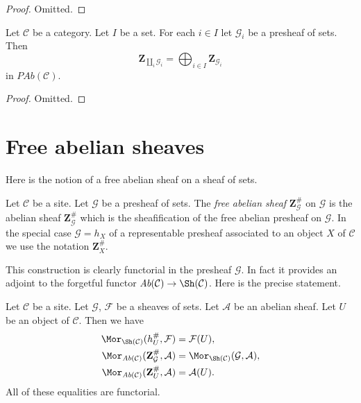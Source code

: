 \begin{proof}
Omitted.
\end{proof}

\begin{lemma}
\label{lemma-coproduct-sum-free-abelian-presheaf}
Let $\mathcal{C}$ be a category.
Let $I$ be a set. For each $i \in I$ let
$\mathcal{G}_i$ be a presheaf of sets.
Then
$$
\mathbf{Z}_{\coprod_i \mathcal{G}_i}
=
\bigoplus\nolimits_{i \in I} \mathbf{Z}_{\mathcal{G}_i}
$$
in $\textit{PAb}(\mathcal{C})$.
\end{lemma}

\begin{proof}
Omitted.
\end{proof}



\section{Free abelian sheaves}
\label{section-free-abelian-sheaf}

\noindent
Here is the notion of a free abelian sheaf on a sheaf of sets.

\begin{definition}
\label{definition-free-abelian-sheaf-on}
Let $\mathcal{C}$ be a site. Let $\mathcal{G}$ be a presheaf of sets.
The {\it free abelian sheaf} $\mathbf{Z}_\mathcal{G}^\#$
on $\mathcal{G}$ is the abelian sheaf $\mathbf{Z}_\mathcal{G}^\#$
which is the sheafification of the free abelian presheaf on $\mathcal{G}$.
In the special case $\mathcal{G} = h_X$ of a representable presheaf
associated to an object $X$ of $\mathcal{C}$
we use the notation $\mathbf{Z}_X^\#$.
\end{definition}

\noindent
This construction is clearly functorial in the presheaf $\mathcal{G}$.
In fact it provides an adjoint to the forgetful functor
$\textit{Ab}(\mathcal{C}) \to \Sh(\mathcal{C})$.
Here is the precise statement.

\begin{lemma}
\label{lemma-obvious-adjointness-sheaves}
Let $\mathcal{C}$ be a site.
Let $\mathcal{G}$, $\mathcal{F}$ be a sheaves of sets.
Let $\mathcal{A}$ be an abelian sheaf.
Let $U$ be an object of $\mathcal{C}$. Then
we have
\begin{align*}
\Mor_{\Sh(\mathcal{C})}(h_U^\#, \mathcal{F})
& =
\mathcal{F}(U), \\
\Mor_{\textit{Ab}(\mathcal{C})}(\mathbf{Z}_\mathcal{G}^\#,
\mathcal{A})
& =
\Mor_{\Sh(\mathcal{C})}(\mathcal{G}, \mathcal{A}), \\
\Mor_{\textit{Ab}(\mathcal{C})}(\mathbf{Z}_U^\#, \mathcal{A})
& =
\mathcal{A}(U).
\end{align*}
All of these equalities are functorial.
\end{lemma}

